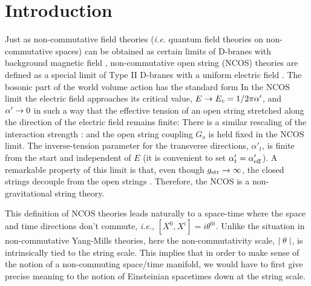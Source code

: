 \section{Introduction}
\label{Introduction}

Just as non-commutative field theories ({\it i.e.}{} quantum field
theories on non-commutative spaces) can be obtained as certain limits
of D-branes with background magnetic field \cite{SW}, non-commutative open
string (NCOS) theories are defined as a special limit of
Type II D-branes with a uniform electric field \cite{SST,GMMS}.
The bosonic part of the world volume action has the standard form
 In the NCOS limit the electric field
approaches its critical value, $E \to E_c = 1/ 2 \pi \alpha'$, and $\alpha' \to
0$ in such a way that the effective
tension of an open string stretched along
the direction of the electric field remains finite:
There is a similar rescaling of the interaction strength \cite{GKP}:
and the open
string coupling $G_o$ is held fixed in the NCOS limit.
The inverse-tension parameter for the transverse directions, $\alpha'_t$,
is finite from the start and independent of $E$ (it is convenient to
set $\alpha'_t = \alpha'_{\rm eff}$).
A remarkable property of this
limit is that, even though $g_{\rm str}\to\infty$, the
closed strings decouple from the open strings \cite{SST,GMMS}. Therefore,
the NCOS is a non-gravitational string theory.

This definition of NCOS theories leads naturally to a space-time
where the space and time directions don't commute,
{\it i.e.}{}, $[X^0, X^i] = i \theta^{0i}$. Unlike the situation in
non-commutative Yang-Mills theories, here the
non-commutativity scale, $\mid \theta \mid$, is intrinsically tied to the
string scale. This implies that in order to make sense of the notion of a
non-commuting space/time manifold, we would have to first give precise
meaning to the notion of Einsteinian spacetimes down at the string scale.

